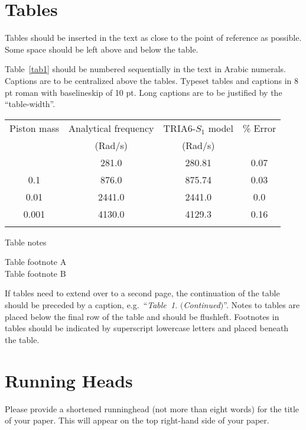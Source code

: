 \documentclass{ws-ijcm}
\begin{document}
\section{Tables}
Tables should be inserted in the text as close to the point of
reference as possible. Some space should be left above and below
the table.

Table~\ref{tab1} should be numbered sequentially in the text in Arabic
numerals. Captions are to be centralized above the tables.  Typeset
tables and captions in 8 pt roman with baselineskip of 10 pt. Long
captions are to be justified by the ``table-width''.

\begin{table}[th]
{\begin{tabular}{@{}cccc@{}} \toprule
Piston mass & Analytical frequency & TRIA6-$S_1$ model &
\% Error \\
& (Rad/s) & (Rad/s) \\ \colrule
1.0\hphantom{00} & \hphantom{0}281.0 & \hphantom{0}280.81 & 0.07 \\
0.1\hphantom{00} & \hphantom{0}876.0 & \hphantom{0}875.74 & 0.03 \\
0.01\hphantom{0} & 2441.0 & 2441.0\hphantom{0} & 0.0\hphantom{0} \\
0.001 & 4130.0 & 4129.3\hphantom{0} & 0.16\\ \botrule
\end{tabular} }
\begin{tabnote}
Table notes
\end{tabnote}
\begin{tabfootnote}
 Table footnote A\\
 Table footnote B
\end{tabfootnote}
\end{table}

If tables need to extend over to a second page, the continuation of
the table should be preceded by a caption, e.g.~``{\it Table~1.}
$(${\it Continued}$)$''. Notes to tables are placed below the final
row of the table and should be flushleft.  Footnotes in tables
should be indicated by superscript lowercase letters and placed beneath
the table.

\section{Running Heads}
Please provide a shortened runninghead (not more than eight words) for
the title of your paper. This will appear on the top right-hand side
of your paper.
\end{document}

